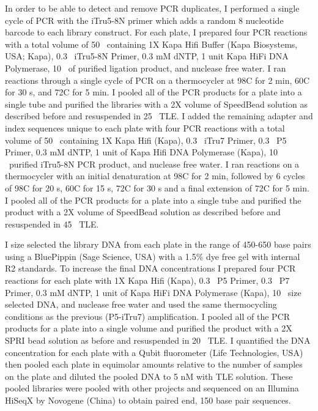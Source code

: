 In order to be able to detect and remove PCR duplicates, I performed a single   
cycle of PCR with the iTru5-8N primer which adds a random 8 nucleotide barcode to 
each library construct.  
For each plate, I prepared four PCR reactions with a total volume of 
50 \uL\ containing 1X Kapa Hifi Buffer (Kapa Biosystems, USA; Kapa),
0.3 \uM\ iTru5-8N Primer, 0.3 mM dNTP, 1 unit Kapa HiFi DNA Polymerase,
10 \uL\ of purified ligation product, and nuclease free water.
I ran reactions through a single cycle of PCR on a thermocycler at 98\degree C for 2 min, 
60\degree C for 30 s, and 72\degree C for 5 min. 
I pooled all of the PCR products for a plate into a single tube and purified the
libraries with a 2X volume of SpeedBead solution as described before and 
resuspended in 25 \uL\ TLE.
I added the remaining adapter and index sequences unique to each plate with four PCR
reactions with a total volume of 50 \uL\ containing 1X Kapa Hifi (Kapa),
0.3 \uM\ iTru7 Primer, 0.3 \uM\ P5 Primer, 0.3 mM dNTP, 1 unit of Kapa Hifi DNA Polymerase (Kapa),
10 \uL\ purified iTru5-8N PCR product, and nuclease free water.
I ran reactions on a thermocycler with an initial denaturation at 98\degree C for 2 min, 
followed by 6 cycles of 98\degree C for 20 s, 60\degree C for 15 s, 72\degree C 
for 30 s and a final extension of 72\degree C for 5 min.
I pooled all of the PCR products for a plate into a single tube and purified the
product with a 2X volume of SpeedBead solution as described before and 
resuspended in 45 \uL\ TLE.

I size selected the library DNA from each plate in the range of 450-650 base pairs using
a BluePippin (Sage Science, USA) with a 1.5\% dye free gel with internal R2 standards. 
To increase the final DNA concentrations I prepared four PCR reactions for each 
plate with 1X Kapa Hifi (Kapa), 0.3 \uM\ P5 Primer, 0.3 \uM\ P7 Primer, 0.3 mM dNTP, 
1 unit of Kapa HiFi DNA Polymerase (Kapa), 10 \uL\ size selected DNA, and 
nuclease free water and used the same thermocycling conditions as the previous
(P5-iTru7) amplification.
I pooled all of the PCR products for a plate into a single volume and purified 
the product with a 2X SPRI bead solution as before and resuspended in 20 \uL\ TLE. 
I quantified the DNA concentration for each plate with a Qubit fluorometer 
(Life Technologies, USA) then pooled each plate in equimolar amounts relative 
to the number of samples on the plate and diluted the pooled DNA to 5 nM with
TLE solution. 
These pooled libraries were pooled with other projects and sequenced on an Illumina 
HiSeqX by Novogene (China) to obtain paired end, 150 base pair sequences. 

